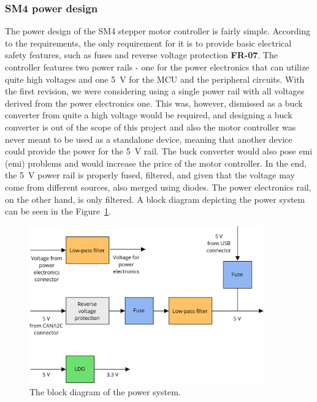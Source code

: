 \subsubsection{SM4 power design}
\label{subsubsec:power_design}
The power design of the SM4 stepper motor controller is fairly simple.
According to the requirements, the only requirement for it is to provide basic electrical safety features, such as fuses and reverse voltage protection \textbf{FR-07}.
The controller features two power rails - one for the power electronics that can utilize quite high voltages and one 5~V for the MCU and the peripheral circuits.
With the first revision, we were considering using a single power rail with all voltages derived from the power electronics one.
This was, however, dismissed as a buck converter from quite a high voltage would be required, and designing a buck converter is out of the scope of this project and also the motor controller was never meant to be used as a standalone device, meaning that another device could provide the power for the 5~V rail.
The buck converter would also pose \acs{emi} (\acl{emi}) problems and would increase the price of the motor controller.
In the end, the 5~V power rail is properly fused, filtered, and given that the voltage may come from different sources, also merged using diodes.
The power electronics rail, on the other hand, is only filtered.
A block diagram depicting the power system can be seen in the Figure~\ref{fig:power_diagram}.

\begin{figure}[H]
    \centering
    \includegraphics[width=0.9\textwidth]{obrazky/power_block_diagram}
    \caption{The block diagram of the power system.}
    \label{fig:power_diagram}
\end{figure}


